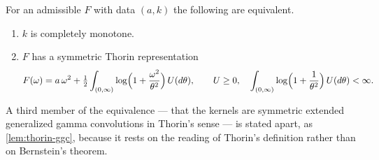 \begin{proposition}\label{prop:thorin-subclass}
\leanok
{}
For an admissible $F$ with data $(a,k)$ the following are equivalent.
\begin{enumerate}
\item $k$ is completely monotone.
\item $F$ has a symmetric Thorin representation
\begin{equation}\label{eq:thorin}
  F(\omega) = a\,\omega^2
   + \tfrac12\int_{(0,\infty)} \log\Bigl(1 + \frac{\omega^2}{\theta^2}\Bigr)\,U(d\theta),
  \qquad U \ge 0, \quad
  \int_{(0,\infty)}\log\Bigl(1 + \frac{1}{\theta^2}\Bigr)\,U(d\theta) < \infty .
\end{equation}
\end{enumerate}
A third member of the equivalence --- that the kernels are symmetric extended generalized gamma
convolutions in Thorin's sense --- is stated apart, as \ref{lem:thorin-ggc}, because it rests on
the reading of Thorin's definition rather than on Bernstein's theorem.


\end{proposition}
